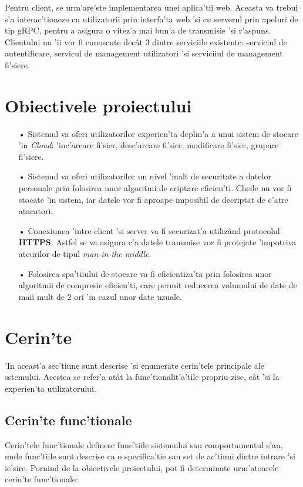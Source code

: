 \documentclass[12pt,a4paper,twoside]{report}
\begin{document}
Pentru client, se urm'are'ste implementarea unei aplica'tii web. Aceasta va trebui s'a interac'tioneze cu utilizatorii prin interfa'ta web 'si cu serverul prin apeluri de tip gRPC, pentru a asigura o vitez'a mai bun'a de transmisie 'si r'aspuns. Clientului nu 'ii vor fi cunoscute decât 3 dintre serviciile existente: serviciul de autentificare, servicul de management utilizatori 'si  serviciiul de management fi'siere.
\section{Obiectivele proiectului}
\begin{itemize}

\item[•]{Sistemul va oferi utilizatorilor experien'ta deplin'a a unui sistem de stocare 'in \textit{Cloud}: 'inc'arcare fi'sier, desc'arcare fi'sier, modificare fi'sier, grupare fi'siere.}

\item[•]{Sistemul va oferi utilizatorilor un nivel 'inalt de securitate a datelor personale prin folosirea unor algoritmi de criptare eficien'ti. Cheile nu vor fi stocate 'in sistem, iar datele vor fi aproape imposibil de decriptat de c'atre atacatori.}

\item[•]{Conexiunea 'intre client 'si server va fi securizat'a utilizând protocolul \textbf{HTTPS}. Astfel se va asigura c'a datele transmise vor fi protejate 'impotriva atcurilor de tipul \textit{man-in-the-middle}.}

\item[•]{Folosirea spa'tiiului de stocare va fi eficientiza'ta prin folosirea unor algoritmii de compresie eficien'ti, care permit reducerea volumului de date de maii mult de 2 ori 'in cazul unor date uzuale.}
\end{itemize}

\section{Cerin'te}
'In aceast'a sec'tiune sunt descrise 'si enumerate cerin'tele principale ale sstemului. Acestea se refer'a atât la func'tionalit'a'tile propriu-zise, cât 'si la experien'ta utilizatorului.
\subsection{Cerin'te func'tionale}
Cerin'tele func'tionale definesc func'tiile sistemului sau comportamentul s'au, unde func'tiile sunt descrise ca o specifica'tie sau set de ac'tiuni dintre intrare 'si ie'sire. Pornind de la
obiectivele proiectului, pot fi determinate urm'atoarele cerin'te func'tionale:
\end{document}
